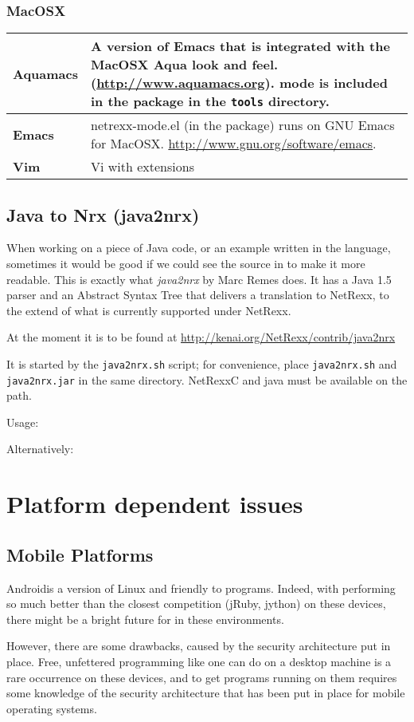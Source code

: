 \subsection{MacOSX}
\begin{tabularx}{\textwidth}{>{\bfseries}lX}
\toprule
Aquamacs & A version of Emacs that is integrated with the MacOSX Aqua
look and feel. (\url{http://www.aquamacs.org}). \nr{} mode is
included in the \nr{} package in the \texttt{tools} directory.
\\\midrule
Emacs & netrexx-mode.el (in the \nr{} package) runs on GNU Emacs for
MacOSX. \url{http://www.gnu.org/software/emacs}.
\\\midrule
Vim & Vi with extensions
\\\bottomrule
\end{tabularx}
\section{Java to Nrx (java2nrx)}
When working on a piece of Java code, or an example written in the
language, sometimes it would be good if we could see the source in
\nr{}to make it more readable. This is exactly what \emph{java2nrx}
by Marc Remes does. It has a  Java 1.5 parser and an Abstract Syntax
Tree that delivers a translation to NetRexx, to the
extend of what is currently supported under NetRexx.

At the moment it is to be found at \url{http://kenai.org/NetRexx/contrib/java2nrx}

It is started by the \texttt{java2nrx.sh} script; for convenience, place \texttt{java2nrx.sh} and \texttt{java2nrx.jar} in the
same directory. NetRexxC and java must be available on the path.

Usage:

Alternatively:


\chapter{Platform dependent issues}
\section{Mobile Platforms}
Android\texttrademark is a version of Linux and friendly to \nr{}
programs. Indeed, with \nr{} performing so much better than the closest
competition (jRuby, jython) on these devices, there might be a bright
future for \nr{} in these environments. 

However, there are some drawbacks, caused by the security architecture
put in place. Free, unfettered programming like one can do on a
desktop machine is a rare occurrence on these devices, and to get
programs running on them requires some knowledge of the security
architecture that has been put in place for mobile operating systems.

